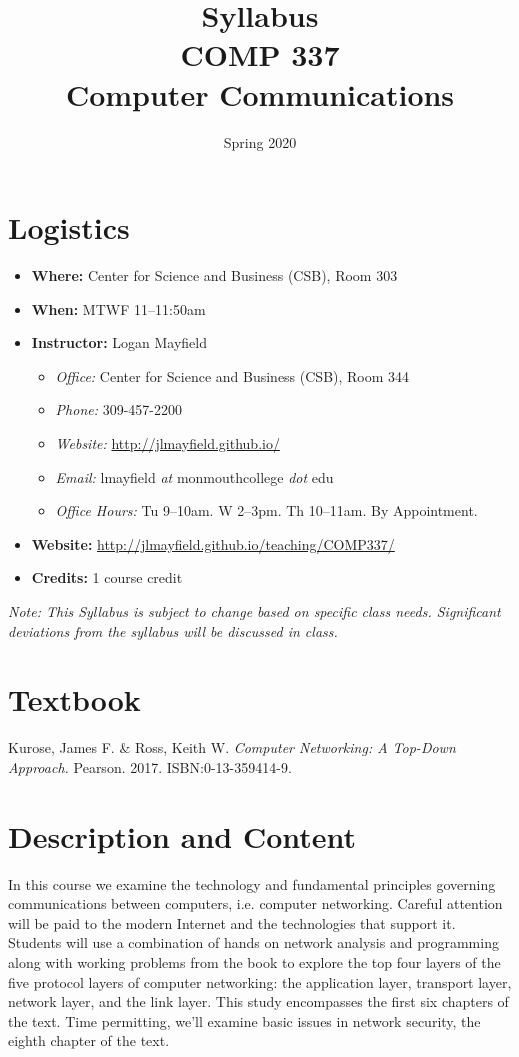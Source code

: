 \documentclass[10pt]{article}
\title{Syllabus \\ COMP 337 \\ Computer Communications}
\author{  }
\date{Spring 2020}
\begin{document}
\maketitle

\section{Logistics}
\begin{itemize}
\item \textbf{Where: }Center for Science and Business (CSB), Room 303
\item \textbf{When: } MTWF 11--11:50am
\item \textbf{Instructor: } Logan Mayfield
\begin{itemize}
\item \textit{Office: } Center for Science and Business (CSB), Room 344
\item \textit{Phone: } 309-457-2200 %
\item \textit{Website: } \url{http://jlmayfield.github.io/}
\item \textit{Email: } lmayfield \textit{at} monmouthcollege \textit{dot} edu
\item \textit{Office Hours: }  Tu 9--10am. W 2--3pm. Th 10--11am. By Appointment.
\end{itemize}
\item \textbf{Website: } \url{http://jlmayfield.github.io/teaching/COMP337/}
\item \textbf{Credits: } 1 course credit
\end{itemize}
\emph{Note: This Syllabus is subject to change based on specific class needs. Significant deviations from the syllabus will be discussed in class.}

\section{Textbook}

\noindent
Kurose, James F. \& Ross, Keith W. \textit{Computer Networking: A Top-Down Approach.} Pearson. 2017. ISBN:0-13-359414-9. %


\section{Description and Content}

In this course we examine the technology and fundamental principles governing communications between computers, i.e. computer networking. Careful attention will be paid to the modern Internet and the technologies that support it.  Students will use a combination of hands on network analysis and programming along with working problems from the book to explore the top four layers of the five protocol layers of computer networking: the application layer, transport layer, network layer, and the link layer. This study encompasses the first six chapters of the text. Time permitting, we'll examine basic issues in network security, the eighth chapter of the text.
\end{document}
